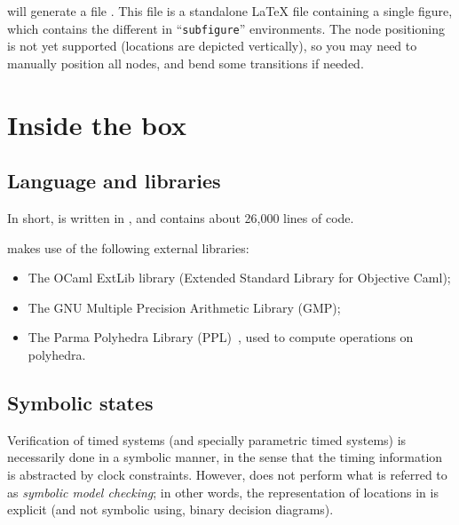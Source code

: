 
\imitator{} will generate a file .
This file is a standalone \LaTeX{} file containing a single figure, which contains the different \IPTA{} in ``\texttt{subfigure}'' environments.
The node positioning is not yet supported (locations are depicted vertically), so you may need to manually position all nodes, and bend some transitions if needed.





\chapter{Inside the box}


\section{Language and libraries}

In short, \imitator{} is written in \ocaml{}, and contains about 26,000 lines of code.

\imitator{} makes use of the following external libraries:

\begin{itemize}
	\item The OCaml ExtLib library (Extended Standard Library for Objective Caml);
	\item The GNU Multiple Precision Arithmetic Library (GMP);
	\item The Parma Polyhedra Library (PPL)~\cite{bhz08}, used to compute operations on polyhedra.
\end{itemize}


\section{Symbolic states}

Verification of timed systems (and specially parametric timed systems) is necessarily done in a symbolic manner, in the sense that the timing information is abstracted by clock constraints.
However, \imitator{} does not perform what is referred to as \emph{symbolic model checking}; in other words, the representation of locations in \imitator{} is explicit (and not symbolic using, \eg{} binary decision diagrams).

